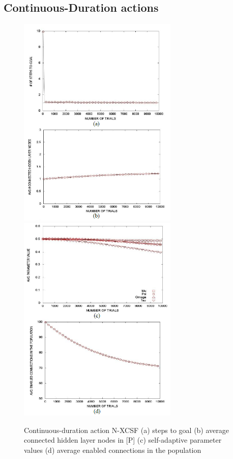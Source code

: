 \documentclass[12pt]{article}
\begin{document}
\subsection{Continuous-Duration actions}
\label{sec:verify}
\begin{figure}[!htbp]
\begin{center}
\includegraphics[width=3in]{5a.png}
\includegraphics[width=3in]{5b.png}
\end{center}
\caption{Continuous-duration action N-XCSF (a) steps to goal (b) average connected hidden layer nodes in [P] (c) self-adaptive parameter values (d) average enabled connections in the population \label{fig:first}}
\end{figure}
\end{document}

